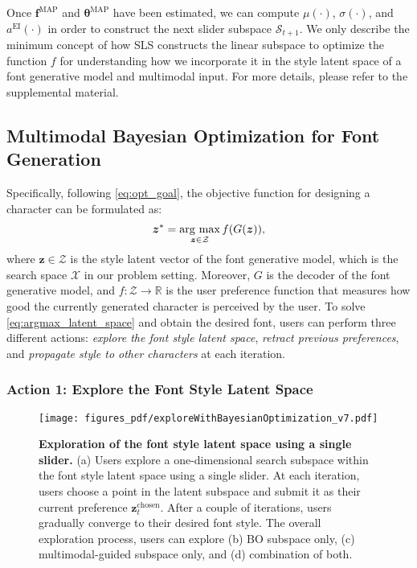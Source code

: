 Once $\bm{f}^{\text{MAP}}$ and $\bm{\theta}^{\text{MAP}}$ have been estimated, we can compute $\mu(\cdot)$, $\sigma(\cdot)$, and $a^{\text{EI}}(\cdot)$ in order to construct the next slider subspace $\mathcal{S}_{t+1}$.
We only describe the minimum concept of how SLS constructs the linear subspace to optimize the function $f$ for understanding how we incorporate it in the style latent space of a font generative model and multimodal input.
For more details, please refer to the supplemental material.


\subsection{Multimodal Bayesian Optimization for Font Generation}
\label{sec:multiModalBayesianOptimization}
Specifically, following \autoref{eq:opt_goal}, the objective function for designing a character can be formulated as:
\begin{align}
\bm{z}^* = \mathop{\rm arg~max}\limits_{\bm{z}\in{\mathcal{Z}}}f(G(\bm{z})), \label{eq:argmax_latent_space}
\end{align}
where $\bm{z} \in\mathcal{Z}$ is the style latent vector of the font generative model, which is the search space $\mathcal{X}$ in our problem setting.
Moreover, $G$ is the decoder of the font generative model, and $f: \mathcal{Z} \rightarrow \mathbb{R}$ is the user preference function that measures how good the currently generated character is perceived by the user.
To solve \autoref{eq:argmax_latent_space} and obtain the desired font, users can perform three different actions: \textit{explore the font style latent space}, \textit{retract previous preferences}, and \textit{propagate style to other characters} at each iteration.

\subsubsection{Action 1: Explore the Font Style Latent Space}
\label{sec:explorationWithSingleSlider}
\begin{figure}[t]
    \centering
    \texttt{[image: figures\_pdf/exploreWithBayesianOptimization\_v7.pdf]}
    \caption{
    \textbf{Exploration of the font style latent space using a single slider.} 
    (a) Users explore a one-dimensional search subspace within the font style latent space using a single slider.
    At each iteration, users choose a point in the latent subspace and submit it as their current preference $\bm{z}^{\text{chosen}}_t$.
    After a couple of iterations, users gradually converge to their desired font style.
    The overall exploration process, users can explore (b) BO subspace only, (c) multimodal-guided subspace only, and (d) combination of both. 
}
    \label{fig:ExploreWithBayesianOptimization}
\end{figure}


